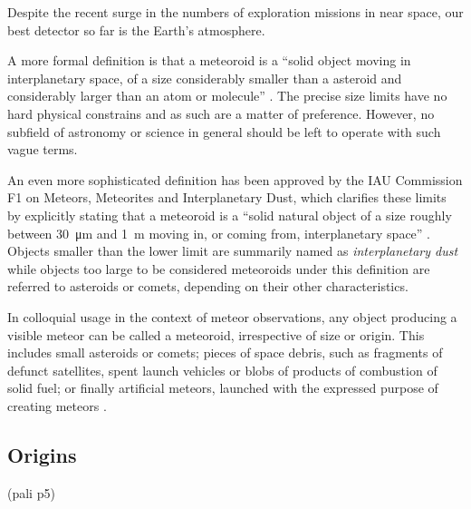     Despite the recent surge in the numbers of exploration missions in near space,
    our best detector so far is the Earth's atmosphere.



    A more formal definition is that a meteoroid is a ``solid object moving in interplanetary space,
    of a size considerably smaller than a asteroid and considerably larger than an atom or molecule'' \citep{imo-glossary}.
    The precise size limits have no hard physical constrains and as such are a matter of preference.
    However, no subfield of astronomy or science in general should be left to operate with such vague terms.

    An even more sophisticated definition has been approved by the IAU Commission F1 on Meteors, Meteorites and Interplanetary Dust,
    which clarifies these limits by explicitly stating that a meteoroid is a ``solid natural object
    of a size roughly between \SI{30}{\micro\metre} and \SI{1}{\metre} moving in, or coming from, interplanetary space'' \citep{imo-definitions}.
    Objects smaller than the lower limit are summarily named as \emph{interplanetary dust} while objects
    too large to be considered meteoroids under this definition are referred to
    asteroids or comets, depending on their other characteristics.

    In colloquial usage in the context of meteor observations, any object producing a visible meteor can be called a meteoroid,
    irrespective of size or origin. This includes small asteroids or comets; pieces of space debris,
    such as fragments of defunct satellites, spent launch vehicles or blobs of products of combustion of solid fuel;
    or finally artificial meteors, launched with the expressed purpose of creating meteors \cite{japončíci}.

    \subsection{Origins}
        (pali p5)

